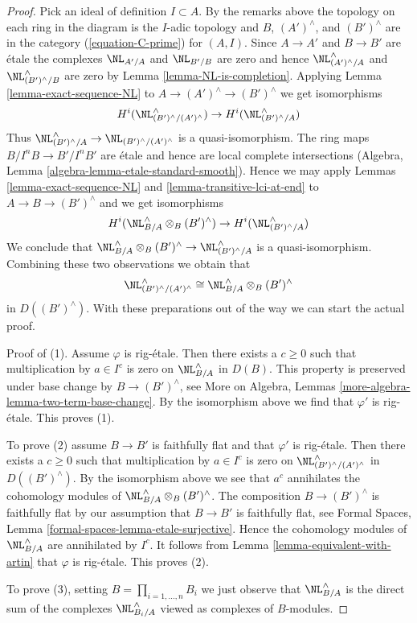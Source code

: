 \begin{proof}
\medskip\noindent
Pick an ideal of definition $I \subset A$. By the remarks above
the topology on each ring in the diagram is the $I$-adic topology
and $B$, $(A')^\wedge$, and $(B')^\wedge$ are in the category
(\ref{equation-C-prime}) for $(A, I)$.
Since $A \to A'$ and $B \to B'$ are \'etale the complexes
$\NL_{A'/A}$ and $\NL_{B'/B}$ are zero and hence
$\NL_{(A')^\wedge/A}^\wedge$ and $\NL_{(B')^\wedge/B}^\wedge$
are zero by Lemma \ref{lemma-NL-is-completion}.
Applying Lemma \ref{lemma-exact-sequence-NL} to
$A \to (A')^\wedge \to (B')^\wedge$ we get isomorphisms
$$
H^i(\NL_{(B')^\wedge/(A')^\wedge}^\wedge) \to H^i(\NL_{(B')^\wedge/A}^\wedge)
$$
Thus $\NL_{(B')^\wedge/A}^\wedge \to \NL_{(B')^\wedge/(A')^\wedge}$
is a quasi-isomorphism. The ring maps $B/I^nB \to B'/I^nB'$ are \'etale
and hence are local complete intersections
(Algebra, Lemma \ref{algebra-lemma-etale-standard-smooth}).
Hence we may apply
Lemmas \ref{lemma-exact-sequence-NL} and
\ref{lemma-transitive-lci-at-end} to
$A \to B \to (B')^\wedge$ and we get isomorphisms
$$
H^i(\NL_{B/A}^\wedge \otimes_B (B')^\wedge) \to
H^i(\NL_{(B')^\wedge/A}^\wedge)
$$
We conclude that
$\NL_{B/A}^\wedge \otimes_B (B')^\wedge \to \NL_{(B')^\wedge/A}^\wedge$
is a quasi-isomorphism. Combining these two observations we obtain that
$$
\NL_{(B')^\wedge/(A')^\wedge}^\wedge \cong
\NL_{B/A}^\wedge \otimes_B (B')^\wedge
$$
in $D((B')^\wedge)$.
With these preparations out of the way we can start the actual proof.

\medskip\noindent
Proof of (1). Assume $\varphi$ is rig-\'etale. Then there exists a $c \geq 0$
such that multiplication by $a \in I^c$ is zero on $\NL_{B/A}^\wedge$
in $D(B)$. This property is preserved under base change
by $B \to (B')^\wedge$, see
More on Algebra, Lemmas \ref{more-algebra-lemma-two-term-base-change}.
By the isomorphism above we find that $\varphi'$ is rig-\'etale.
This proves (1).

\medskip\noindent
To prove (2) assume $B \to B'$ is faithfully flat and that $\varphi'$
is rig-\'etale. Then there exists a $c \geq 0$ such that
multiplication by $a \in I^c$ is zero on
$\NL_{(B')^\wedge/(A')^\wedge}^\wedge$ in $D((B')^\wedge)$.
By the isomorphism above we see that $a^c$ annihilates the
cohomology modules of
$\NL_{B/A}^\wedge \otimes_B (B')^\wedge$.
The composition $B \to (B')^\wedge$ is faithfully flat
by our assumption that $B \to B'$ is faithfully flat, see
Formal Spaces, Lemma \ref{formal-spaces-lemma-etale-surjective}.
Hence the cohomology modules of $\NL_{B/A}^\wedge$ are annihilated
by $I^c$. It follows from Lemma \ref{lemma-equivalent-with-artin}
that $\varphi$ is rig-\'etale.
This proves (2).

\medskip\noindent
To prove (3), setting $B = \prod_{i = 1, \ldots, n} B_i$
we just observe that $\NL_{B/A}^\wedge$ is the direct
sum of the complexes $\NL_{B_i/A}^\wedge$ viewed as complexes
of $B$-modules.
\end{proof}

